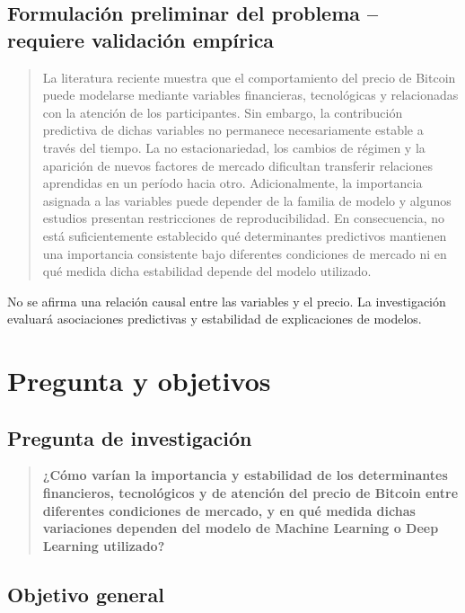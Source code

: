 \documentclass[11pt,letterpaper]{article}
\begin{document}
\subsection{Formulación preliminar del problema -- requiere validación empírica}

\begin{quote}
La literatura reciente muestra que el comportamiento del precio de Bitcoin puede modelarse mediante variables financieras, tecnológicas y relacionadas con la atención de los participantes. Sin embargo, la contribución predictiva de dichas variables no permanece necesariamente estable a través del tiempo. La no estacionariedad, los cambios de régimen y la aparición de nuevos factores de mercado dificultan transferir relaciones aprendidas en un período hacia otro. Adicionalmente, la importancia asignada a las variables puede depender de la familia de modelo y algunos estudios presentan restricciones de reproducibilidad. En consecuencia, no está suficientemente establecido qué determinantes predictivos mantienen una importancia consistente bajo diferentes condiciones de mercado ni en qué medida dicha estabilidad depende del modelo utilizado.
\end{quote}

No se afirma una relación causal entre las variables y el precio. La investigación evaluará asociaciones predictivas y estabilidad de explicaciones de modelos.

\section{Pregunta y objetivos}

\subsection{Pregunta de investigación}

\begin{quote}
\textbf{¿Cómo varían la importancia y estabilidad de los determinantes financieros, tecnológicos y de atención del precio de Bitcoin entre diferentes condiciones de mercado, y en qué medida dichas variaciones dependen del modelo de Machine Learning o Deep Learning utilizado?}
\end{quote}

\subsection{Objetivo general}
\end{document}
